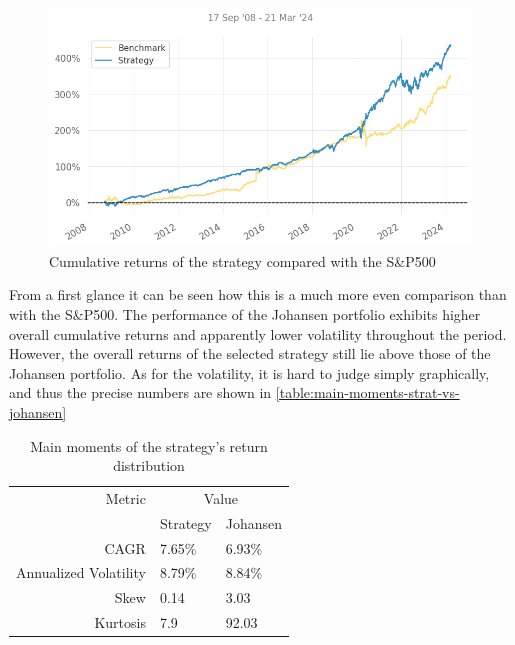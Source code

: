 \begin{figure}[ht]
    \includegraphics[width=\linewidth]{assets/strat-vs-johansen.png}
    \caption{Cumulative returns of the strategy compared with the S\&P500}
    \label{fig:strat-vs-johansen}
\end{figure}

From a first glance it can be seen how this is a much more even comparison than with the S\&P500. The performance of the Johansen portfolio exhibits higher overall cumulative returns and apparently lower volatility throughout the period. However, the overall returns of the selected strategy still lie above those of the Johansen portfolio. As for the volatility, it is hard to judge simply graphically, and thus the precise numbers are shown in \autoref{table:main-moments-strat-vs-johansen}

\begin{table}[ht]
    \centering
    \begin{tabular}{rll}
        \toprule
        Metric & \multicolumn{2}{c}{Value} \\ 
        \cmidrule(lr){2-3}
            & Strategy & Johansen \\
        \midrule
        CAGR & 7.65\% & 6.93\% \\
        Annualized Volatility & 8.79\% & 8.84\% \\
        Skew & 0.14 & 3.03 \\
        Kurtosis & 7.9 & 92.03 \\
        \bottomrule
    \end{tabular}
    \caption{Main moments of the strategy's return distribution}
    \label{table:main-moments-strat-vs-johansen}
\end{table}

